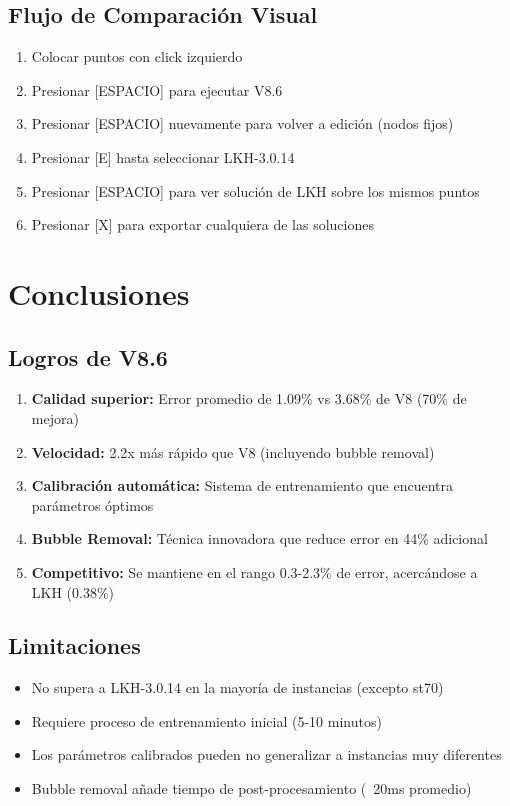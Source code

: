 \documentclass[12pt, a4paper]{article}
\begin{document}
\subsection{Flujo de Comparación Visual}

\begin{enumerate}
    \item Colocar puntos con click izquierdo
    \item Presionar [ESPACIO] para ejecutar V8.6
    \item Presionar [ESPACIO] nuevamente para volver a edición (nodos fijos)
    \item Presionar [E] hasta seleccionar LKH-3.0.14
    \item Presionar [ESPACIO] para ver solución de LKH sobre los mismos puntos
    \item Presionar [X] para exportar cualquiera de las soluciones
\end{enumerate}

\section{Conclusiones}

\subsection{Logros de V8.6}

\begin{enumerate}
    \item \textbf{Calidad superior:} Error promedio de 1.09\% vs 3.68\% de V8 (70\% de mejora)
    \item \textbf{Velocidad:} 2.2x más rápido que V8 (incluyendo bubble removal)
    \item \textbf{Calibración automática:} Sistema de entrenamiento que encuentra parámetros óptimos
    \item \textbf{Bubble Removal:} Técnica innovadora que reduce error en 44\% adicional
    \item \textbf{Competitivo:} Se mantiene en el rango 0.3-2.3\% de error, acercándose a LKH (0.38\%)
\end{enumerate}

\subsection{Limitaciones}

\begin{itemize}
    \item No supera a LKH-3.0.14 en la mayoría de instancias (excepto st70)
    \item Requiere proceso de entrenamiento inicial (5-10 minutos)
    \item Los parámetros calibrados pueden no generalizar a instancias muy diferentes
    \item Bubble removal añade tiempo de post-procesamiento (~20ms promedio)
\end{itemize}
\end{document}
